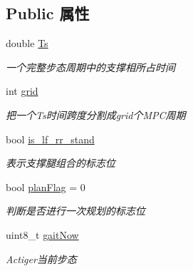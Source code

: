 \subsection*{Public 属性}
\begin{DoxyCompactItemize}
\item 
\mbox{\label{classquadruped_1_1MotionPlan_a4d6a1024fc5a2612dca34af18fe5998d}} 
double \hyperlink{classquadruped_1_1MotionPlan_a4d6a1024fc5a2612dca34af18fe5998d}{Ts}
\begin{DoxyCompactList}\small\item\em 一个完整步态周期中的支撑相所占时间 \end{DoxyCompactList}\item 
\mbox{\label{classquadruped_1_1MotionPlan_a7d5ada02315ce7346bd441c92c5156a5}} 
int \hyperlink{classquadruped_1_1MotionPlan_a7d5ada02315ce7346bd441c92c5156a5}{grid}
\begin{DoxyCompactList}\small\item\em 把一个\+Ts时间跨度分割成grid个\+M\+P\+C周期 \end{DoxyCompactList}\item 
\mbox{\label{classquadruped_1_1MotionPlan_af5ed3b39ee344757263733bed5731f7e}} 
bool \hyperlink{classquadruped_1_1MotionPlan_af5ed3b39ee344757263733bed5731f7e}{is\+\_\+lf\+\_\+rr\+\_\+stand}
\begin{DoxyCompactList}\small\item\em 表示支撑腿组合的标志位 \end{DoxyCompactList}\item 
\mbox{\label{classquadruped_1_1MotionPlan_ad994c500c74ec400b375115edda79ce5}} 
bool \hyperlink{classquadruped_1_1MotionPlan_ad994c500c74ec400b375115edda79ce5}{plan\+Flag} = 0
\begin{DoxyCompactList}\small\item\em 判断是否进行一次规划的标志位 \end{DoxyCompactList}\item 
\mbox{\label{classquadruped_1_1MotionPlan_ad0e16c69f420367d4d05140b15db2342}} 
uint8\+\_\+t \hyperlink{classquadruped_1_1MotionPlan_ad0e16c69f420367d4d05140b15db2342}{gait\+Now}
\begin{DoxyCompactList}\small\item\em Actiger当前步态 \end{DoxyCompactList}\item 

\end{DoxyCompactItemize}
